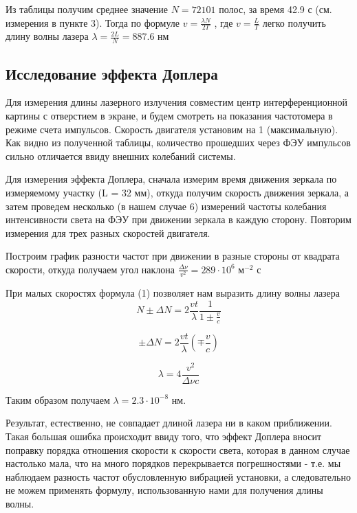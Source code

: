 \begin{table}[h!]
	\centering
	
	\caption{}
	\label{nu1}
\end{table}  


Из таблицы получим среднее значение $N = 72101$ полос, за время 42.9 с (см. измерения в пункте 3). Тогда по формуле $v = \frac{\lambda N}{2T}$ , где $v = \frac{L}{T}$ легко получить длину волны лазера $\lambda = \frac{2L}{N} = 887.6$ нм


\subsection{Исследование эффекта Доплера}

Для измерения длины лазерного излучения совместим центр интерференционной картины с отверстием в экране, и будем смотреть на показания частотомера в режиме счета импульсов.
Скорость двигателя установим на 1 (максимальную).
Как видно из полученной таблицы, количество прошедших через ФЭУ импульсов сильно отличается ввиду внешних колебаний системы.

Для измерения эффекта Доплера, сначала измерим время движения зеркала по измеряемому участку (L = 32 мм), откуда получим скорость движения зеркала, а затем проведем несколько (в нашем случае 6) измерений частоты колебания интенсивности света на ФЭУ при движении зеркала в каждую сторону.
Повторим измерения для трех разных скоростей двигателя.

Построим график разности частот при движении в разные стороны от квадрата скорости, откуда получаем угол наклона $\frac{\Delta \nu}{v^2} = 289 \cdot 10^{6}$ $\text{м}^{-2} $ с

При малых скоростях формула (1) позволяет нам выразить длину волны лазера
\begin{equation}
    N \pm \Delta N = 2\frac{vt}{\lambda}\frac{1}{1 \pm \frac{v}{c}}
\end{equation}

\begin{equation}
    \pm \Delta N = 2\frac{vt}{\lambda}(\mp \frac{v}{c})
\end{equation}


\begin{equation}
    \lambda = 4\frac{v^2}{\Delta \nu c}
\end{equation}

Таким образом получаем $\lambda = 2.3 \cdot 10^{-8}$ нм.

Результат, естественно, не совпадает длиной лазера ни в каком приближении. Такая большая ошибка происходит ввиду того, что эффект Доплера вносит поправку порядка отношения скорости к скорости света, которая в данном случае настолько мала, что на много порядков перекрывается погрешностями - т.е. мы наблюдаем разность частот обусловленную вибрацией установки, а следовательно не можем применять формулу, использованную нами для получения длины волны.

